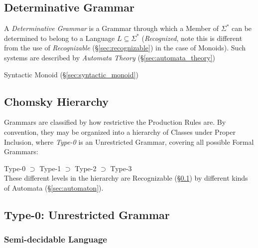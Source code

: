 \subsection{Determinative Grammar}\label{sec:determinative_grammar}

A \emph{Determinative Grammar} is a Grammar through which a Member of
$\Sigma^*$ can be determined to belong to a Language $L \subseteq
\Sigma^*$ (\emph{Recognized}, note this is different from the use of
\emph{Recognizable} (\S\ref{sec:recognizable}) in the case of
Monoids). Such systems are described by \emph{Automata Theory}
(\S\ref{sec:automata_theory})

Syntactic Monoid (\S\ref{sec:syntactic_monoid})



\subsection{Chomsky Hierarchy}\label{sec:chomsky_hierarchy}
\cite{chomsky56}

Grammars are classified by how restrictive the Production Rules are.
By convention, they may be organized into a hierarchy of Classes under
Proper Inclusion, where \emph{Type-0} is an Unrestricted Grammar,
covering all possible Formal Grammars:

  Type-0 $\supset$ Type-1 $\supset$ Type-2 $\supset$ Type-3 \\
These different levels in the hierarchy are Recognizable
(\S\ref{sec:determinative_grammar}) by different kinds of Automata
(\S\ref{sec:automaton}).



\subsection{Type-0: Unrestricted Grammar}\label{sec:unrestricted_grammar}

\subsubsection{Semi-decidable Language}\label{sec:semidecidable}

